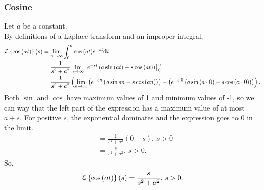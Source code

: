 \subsubsection{Cosine}
\noindent
Let $a$ be a constant.\\
By definitions of a Laplace transform and an improper integral,
\begin{align*}
	\mathcal{L}\left\{ \cos{(at)} \right\}\left(s\right) &= \lim\limits_{n\to\infty}{\int_{0}^{n}{\cos{(at)}e^{-st}\mathrm{d}t}} \\
	&= \frac{1}{s^2 + a^2}\lim\limits_{n\to\infty}{\left[e^{-st}\left(a\sin{(at)} - s\cos{(at)}\right)\right]_{0}^{n}} \\
	&= \frac{1}{s^2 + a^2}\left(\lim\limits_{n\to\infty}{\left(e^{-sn}\left(a\sin{sn} - s\cos{(an)}\right)\right)} - \left(e^{-s\cdot 0}\left(a\sin{(a\cdot 0)} - s\cos{(a\cdot 0)}\right)\right)\right).
\end{align*}
Both $\sin$ and $\cos$ have maximum values of 1 and minimum values of -1, so we can way that the left part of the expression has a maximum value of at most $a + s$.
For positive $s$, the exponential dominates and the expression goes to 0 in the limit.
\begin{align*}
	 &= \frac{1}{s^2 + a^2}\left(0 + s\right) \text{, } s > 0 \\
	 &= \frac{s}{s^2 + a^2} \text{, } s > 0.
\end{align*}
So,
\begin{equation*}
	\mathcal{L}\left\{ \cos{(at)} \right\}\left(s\right) = \frac{s}{s^2 + a^2} \text{, } s > 0.
\end{equation*}